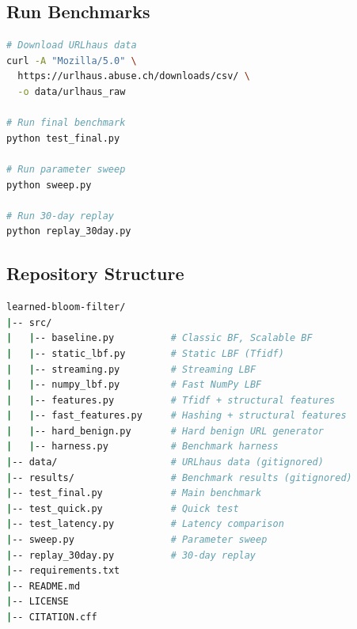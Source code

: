 \documentclass[11pt,a4paper]{article}
\begin{document}
\subsection{Run Benchmarks}

\begin{lstlisting}[language=bash]
# Download URLhaus data
curl -A "Mozilla/5.0" \
  https://urlhaus.abuse.ch/downloads/csv/ \
  -o data/urlhaus_raw

# Run final benchmark
python test_final.py

# Run parameter sweep
python sweep.py

# Run 30-day replay
python replay_30day.py
\end{lstlisting}

\subsection{Repository Structure}

\begin{lstlisting}[language=bash]
learned-bloom-filter/
|-- src/
|   |-- baseline.py          # Classic BF, Scalable BF
|   |-- static_lbf.py        # Static LBF (Tfidf)
|   |-- streaming.py         # Streaming LBF
|   |-- numpy_lbf.py         # Fast NumPy LBF
|   |-- features.py          # Tfidf + structural features
|   |-- fast_features.py     # Hashing + structural features
|   |-- hard_benign.py       # Hard benign URL generator
|   |-- harness.py           # Benchmark harness
|-- data/                    # URLhaus data (gitignored)
|-- results/                 # Benchmark results (gitignored)
|-- test_final.py            # Main benchmark
|-- test_quick.py            # Quick test
|-- test_latency.py          # Latency comparison
|-- sweep.py                 # Parameter sweep
|-- replay_30day.py          # 30-day replay
|-- requirements.txt
|-- README.md
|-- LICENSE
|-- CITATION.cff
\end{lstlisting}
\end{document}
